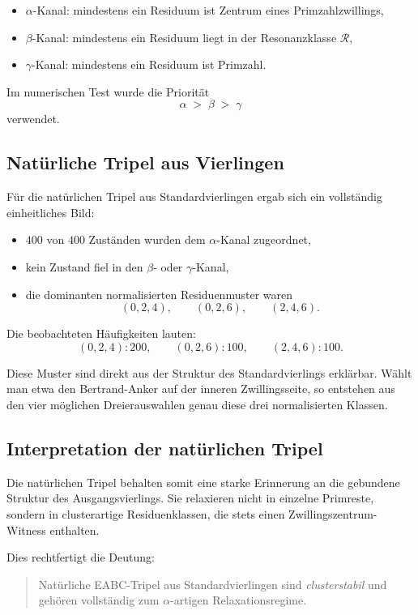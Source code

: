 \documentclass[11pt,a4paper]{article}
\theoremstyle{definition}
\theoremstyle{plain}
\theoremstyle{remark}
\begin{document}
	\begin{itemize}
		\item \(\alpha\)-Kanal: mindestens ein Residuum ist Zentrum eines Primzahlzwillings,
		\item \(\beta\)-Kanal: mindestens ein Residuum liegt in der Resonanzklasse \(\mathcal R\),
		\item \(\gamma\)-Kanal: mindestens ein Residuum ist Primzahl.
	\end{itemize}
	
	Im numerischen Test wurde die Priorität
	\[
	\alpha \;>\; \beta \;>\; \gamma
	\]
	verwendet.
	
	\subsection{Natürliche Tripel aus Vierlingen}
	
	Für die natürlichen Tripel aus Standardvierlingen ergab sich ein vollständig einheitliches Bild:
	
	\begin{itemize}
		\item \(400\) von \(400\) Zuständen wurden dem \(\alpha\)-Kanal zugeordnet,
		\item kein Zustand fiel in den \(\beta\)- oder \(\gamma\)-Kanal,
		\item die dominanten normalisierten Residuenmuster waren
		\[
		(0,2,4),\qquad (0,2,6),\qquad (2,4,6).
		\]
	\end{itemize}
	
	Die beobachteten Häufigkeiten lauten:
	\[
	(0,2,4): 200,\qquad
	(0,2,6): 100,\qquad
	(2,4,6): 100.
	\]
	
	Diese Muster sind direkt aus der Struktur des Standardvierlings erklärbar. 
	Wählt man etwa den Bertrand-Anker auf der inneren Zwillingsseite, so entstehen aus den vier möglichen Dreierauswahlen genau diese drei normalisierten Klassen.
	
	\subsection{Interpretation der natürlichen Tripel}
	
	Die natürlichen Tripel behalten somit eine starke Erinnerung an die gebundene Struktur des Ausgangsvierlings. 
	Sie relaxieren nicht in einzelne Primreste, sondern in clusterartige Residuenklassen, die stets einen Zwillingszentrum-Witness enthalten.
	
	Dies rechtfertigt die Deutung:
	\begin{quote}
		Natürliche EABC-Tripel aus Standardvierlingen sind \emph{clusterstabil} und gehören vollständig zum \(\alpha\)-artigen Relaxationsregime.
	\end{quote}
	
\end{document}
